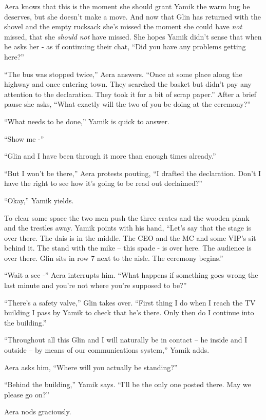 \documentclass[twoside,11pt]{book}
\begin{document}
Aera knows that this is the moment she should grant Yamik the warm hug he deserves, but she doesn't make a move. And now
that Glin has returned with the shovel and the empty rucksack she's missed the moment she could have \textit{not}
missed, that she \textit{should} \textit{not} have missed. She hopes Yamik didn't sense that when he asks her - as if
continuing their chat, ``Did you have any problems getting here?''

``The bus was stopped twice,'' Aera answers. ``Once at some place along the
highway and once entering town. They searched the basket but didn't pay any attention to the declaration. They took it
for a bit of scrap paper.'' After a brief pause she asks, ``What exactly will the two of you
be doing at the ceremony?''

``What needs to be done,'' Yamik is quick to answer.

``Show me -''

``Glin and I  have been through it more than enough times already.''

``But I won't be there,'' Aera protests pouting, ``I drafted the declaration.
Don't I have the right to see how it's going to be read out declaimed?''

``Okay,'' Yamik yields.

To clear some space the two men push the three crates and the wooden plank and the trestles
away. Yamik points with his hand, ``Let's say that the stage is
over there. The dais is in the middle. The CEO and the MC and some VIP's sit behind it. The stand with the mike -- this
spade -  is over here. The audience is over there. Glin sits in row 7 next to the aisle. The ceremony
begins.''

``Wait a sec -'' Aera interrupts him. ``What happens if something goes wrong the
last minute and you're not where you're supposed to be?''

``There's  a safety valve,'' Glin takes over. ``First thing I do when I reach the
TV building I pass by Yamik to check that he's there. Only then do I continue into the building.''

``Throughout all this Glin and I will naturally be in contact -- he inside and I outside -- by means of
our communications system,'' Yamik adds.

Aera asks him, ``Where will you actually be standing?''

``Behind the building,'' Yamik says. ``I'll be the only one posted
there. May we please go on?''

Aera nods graciously.
\end{document}
